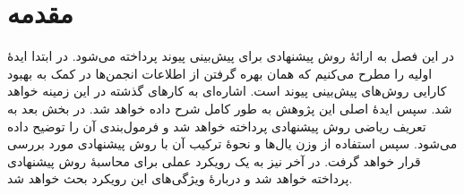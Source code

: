 \section{مقدمه}
در این فصل به ارائهٔ روش پیشنهادی برای پیش‌بینی پیوند پرداخته می‌شود. در ابتدا ایدهٔ اولیه را مطرح می‌کنیم که همان بهره گرفتن از اطلاعات انجمن‌ها در کمک به بهبود کارایی روش‌های پیش‌بینی پیوند است. اشاره‌ای به کارهای گذشته در این زمینه خواهد شد. سپس ایدهٔ اصلی این پژوهش به طور کامل شرح داده خواهد شد. در بخش بعد به تعریف ریاضی روش پیشنهادی پرداخته خواهد شد و فرمول‌بندی آن را توضیح داده می‌شود. سپس استفاده از وزن یال‌ها و نحوهٔ ترکیب آن با روش پیشنهادی مورد بررسی قرار خواهد گرفت. در آخر نیز به یک رویکرد عملی برای محاسبهٔ روش پیشنهادی پرداخته خواهد شد و دربارهٔ ویژگی‌های این رویکرد بحث خواهد شد.
\\[2cm]
